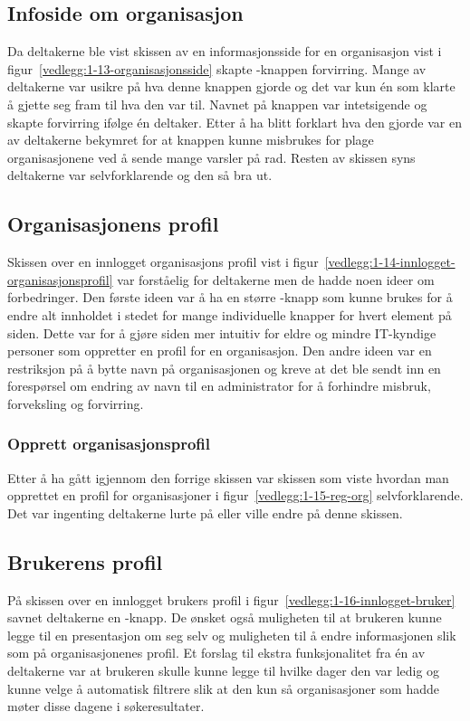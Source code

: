 \subsection{Infoside om organisasjon}

Da deltakerne ble vist skissen av en informasjonsside for en organisasjon vist i figur~\ref{vedlegg:1-13-organisasjonsside} skapte -knappen forvirring. Mange av deltakerne var usikre på hva denne knappen gjorde og det var kun én som klarte å gjette seg fram til hva den var til. Navnet på knappen var intetsigende og skapte forvirring ifølge én deltaker. Etter å ha blitt forklart hva den gjorde var en av deltakerne bekymret for at knappen kunne misbrukes for plage organisasjonene ved å sende mange varsler på rad. Resten av skissen syns deltakerne var selvforklarende og den så bra ut. 


\subsection{Organisasjonens profil}

Skissen over en innlogget organisasjons profil vist i figur~\ref{vedlegg:1-14-innlogget-organisasjonsprofil} var forståelig for deltakerne men de hadde noen ideer om forbedringer. Den første ideen var å ha en større -knapp som kunne brukes for å endre alt innholdet i stedet for mange individuelle knapper for hvert element på siden. Dette var for å gjøre siden mer intuitiv for eldre og mindre IT-kyndige personer som oppretter en profil for en  organisasjon. Den andre ideen var en restriksjon på å bytte navn på organisasjonen og kreve at det ble sendt inn en forespørsel om endring av navn til en administrator for å forhindre misbruk, forveksling og forvirring.

\subsubsection{Opprett organisasjonsprofil}

Etter å ha gått igjennom den forrige skissen var skissen som viste hvordan man opprettet en profil for organisasjoner i figur~\ref{vedlegg:1-15-reg-org} selvforklarende. Det var ingenting deltakerne lurte på eller ville endre på denne skissen.

\subsection{Brukerens profil}

På skissen over en innlogget brukers profil i figur~\ref{vedlegg:1-16-innlogget-bruker} savnet deltakerne en -knapp. De ønsket også muligheten til at brukeren kunne legge til en presentasjon om seg selv og muligheten til å endre informasjonen slik som på organisasjonenes profil. Et forslag til ekstra funksjonalitet fra én av deltakerne var at brukeren skulle kunne legge til hvilke dager den var ledig og kunne velge å automatisk filtrere slik at den kun så organisasjoner som hadde møter disse dagene i søkeresultater.


